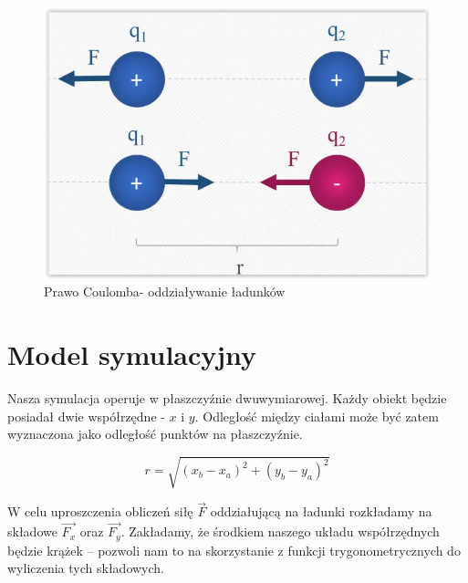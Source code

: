 \documentclass{article}
\begin{document}
\begin{figure}[h]
    \centering
    \includegraphics[scale=0.5]{img/Prawo_Coulomba.PNG}

    \caption{Prawo Coulomba- oddziaływanie ładunków}
    \label{fig:Prawo_Coulomba}
\end{figure}

\clearpage

\section{Model symulacyjny}

Nasza symulacja operuje w płaszczyźnie dwuwymiarowej. Każdy obiekt będzie posiadał dwie współrzędne - $x$ i $y$. Odległość między ciałami może być zatem wyznaczona jako odległość punktów na płaszczyźnie.

$$
r=\sqrt{\left(x_{b}-x_{a}\right)^{2}+\left(y_{b}-y_{a}\right)^{2}}
$$

\noindent W celu uproszczenia obliczeń siłę $\vec{F}$ oddziałującą na ładunki rozkładamy na składowe $\vec{F_x}$ oraz $\vec{F_y}$. Zakładamy, że środkiem naszego układu współrzędnych będzie krążek -- pozwoli nam to na skorzystanie z funkcji trygonometrycznych do wyliczenia tych składowych.


\end{document}
